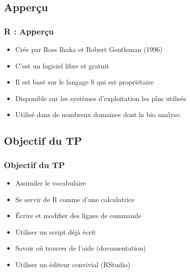 \documentclass{beamer}
\begin{document}
\subsection{Apperçu}

\begin{frame}
	\frametitle{R : Apperçu}
	\begin{center}
		\begin{block}{}
			\begin{itemize}
				\item Crée par Ross Ihaka et Robert Gentleman (1996)
				\item C'est un logiciel libre et gratuit
				\item Il est basé sur le langage S qui est propriétaire
				\item Disponible sur les systèmes d'exploitation les plus utilisés
				\item Utilisé dans de nombreux domaines dont la bio analyse.
			\end{itemize}
		\end{block}
	\end{center}
\end{frame}

\subsection{Objectif du TP}
\begin{frame}
	\frametitle{Objectif du TP}
	\begin{center}
		
	\begin{itemize}
		\item {Assimiler le vocabulaire }
		\item {Se servir de R comme d'une calculatrice}
		\item {Écrire et modifier des lignes de commande}
		\item {Utiliser un script déjà écrit}
		\item {Savoir où trouver de l'aide (documentation)}
		\item {Utiliser un éditeur convivial (RStudio)}%
	\end{itemize}
	\end{center}
\end{frame}
\end{document}
